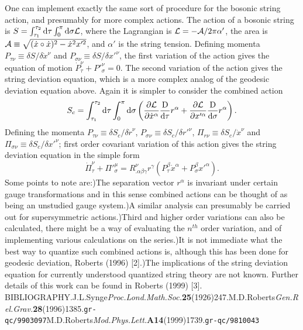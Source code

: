 \documentclass[a4paper,a4paper]{article}
\begin{document}
One can implement exactly the same sort of procedure 
for the bosonic string action,  and presumably for more complex actions.
The action of a bosonic string is
$S=\int^{\tau_2}_{\tau_1}{\rm d}\tau\int^\pi_0{\rm d}\sigma{\cal{L}}$,
where the Lagrangian is
${\cal{L}}=-{\cal{A}}/2\pi\alpha'$,
the area is
${\cal{A}}\equiv\sqrt{(\dot{x}\circ\dot{x})^2-\dot{x}^2x'^2}$,
and $\alpha'$ is the string tension.   Defining momenta
$P_{\tau\nu}\equiv\delta S/\delta\dot{x}^\nu$
and
$P_{\sigma\nu}\equiv\delta S/\delta x'^\nu$,
the first variation of the action gives the equation of motion
$\dot{P}^\nu_\tau+P'^\nu_\sigma=0$.
The second variation of the action gives the string deviation equation,
which is a more complex analog of the geodesic deviation equation above.
Again it is simpler to consider the combined action
\begin{equation}
S_c=\int^{\tau_2}_{\tau_1}{\rm d}\tau\int^\pi_0{\rm d}\sigma
\left(\frac{\partial{\cal{L}}}{\partial\dot{x}^\alpha}
      \frac{{\rm D}}{\rm{d}\tau}r^\alpha
     +\frac{\partial{\cal{L}}}{\partial x'^\alpha}
      \frac{{\rm D}}{\rm{d}\sigma}r^\alpha\right).
\end{equation}
Defining the momenta
$P_{\tau\nu}\equiv\delta S_c/\delta\dot{r}^\nu$,
$P_{\sigma\nu}\equiv\delta S_c/\delta r'^\nu$,
$\Pi_{r\nu}\equiv\delta S_c/\dot{x}^\nu$ and
$\Pi_{\sigma\nu}\equiv\delta S_c/\delta x'^\nu$;
first order covariant variation of this action gives 
the string deviation equation in the simple form
\begin{equation}
\dot{\Pi}^\nu_\tau+\Pi'^\mu_\sigma=R^\nu_{.\alpha\beta\gamma}r^\gamma
\left(P^\beta_\tau\dot{x}^\alpha+P^\beta_\sigma x'^\alpha\right).
\end{equation}
Some points to note are:)The separation vector $r^\alpha$ is invariant under certain gauge
transformations and in this sense combined actions can be thought of as 
being an unstudied gauge system.)A similar analysis can presumably 
be carried out for supersymmetric actions.)Third and higher order variations can also be calculated,
there might be a way of evaluating the $n^{th}$ order variation,
and of implementing various calculations on the series.)It is not immediate what the best way to quantize such combined actions is,
although this has been done for geodesic deviation,  
Roberts (1996) [2].)The implications of the string deviation equation for currently 
understood quantized string theory are not known.\newline
Further details of this work can be found in Roberts (1999) [3].\newline
BIBLIOGRAPHY.\newline
[1]J.L.Synge{\it Proc.Lond.Math.Soc.}{\bf 25}(1926)247.\newline
[2]M.D.Roberts{\it Gen.Rel.Grav.}{\bf 28}(1996)1385.{\tt gr-qc/9903097}\newline
[3]M.D.Roberts{\it Mod.Phys.Lett.}{\bf A14}(1999)1739.{\tt gr-qc/9810043}
\end{document}
